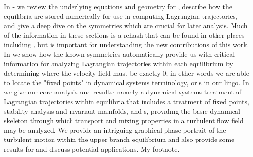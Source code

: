In - we review the underlying equations 
and geometry for {\pCf}, describe how the equilibria are stored 
numerically for use in computing Lagrangian trajectories, and give a deep 
dive on the symmetries which are crucial for later analysis. Much of the 
information in these sections is a rehash that can be found in other 
places including \citet{GHCW07}, but is important for understanding the 
new contributions of this work.  In  we show how 
the known symmetries automatically provide us with critical information 
for analyzing Lagrangian trajectories within each equilibrium by 
determining where the velocity field must be exactly 0; in other words we 
are able to locate the "fixed points" in dynamical systems terminology, 
or {\stagp}s in our lingo. In  we give our core 
analysis and results: namely a dynamical systems treatment of Lagrangian 
trajectories within {\pC} equilibria that includes a treatment of 
fixed points, stability analysis and invariant manifolds, and {\hc}s, 
providing the basic dynamical skeleton through which transport and mixing 
properties in a turbulent flow field may be analyzed. We provide an 
intriguing graphical phase portrait of the turbulent motion within the 
upper branch equilibrium and also provide some results for {\tEQeight} and 
discuss potential applications.
 {My footnote.}
 

